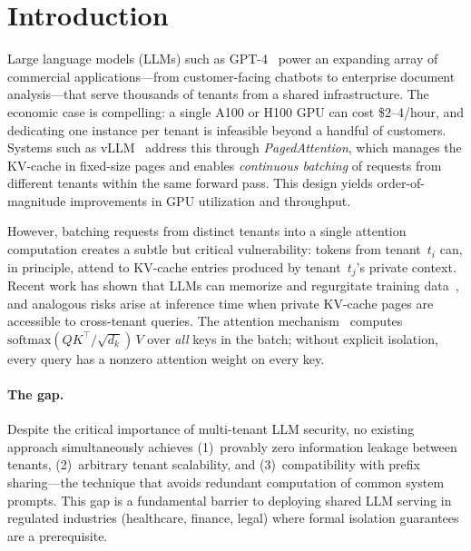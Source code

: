 \documentclass[11pt]{article}
\begin{document}
\section{Introduction}
\label{sec:introduction}

Large language models (LLMs) such as GPT-4~\citep{brown2020language,
achiam2023gpt4} power an expanding array of commercial applications---from
customer-facing chatbots to enterprise document analysis---that serve
thousands of tenants from a shared infrastructure.  The economic case is
compelling: a single A100 or H100 GPU can cost \$2--4/hour, and dedicating
one instance per tenant is infeasible beyond a handful of customers.
Systems such as vLLM~\citep{kwon2023vllm} address this through
\emph{PagedAttention}, which manages the KV-cache in fixed-size pages and
enables \emph{continuous batching} of requests from different tenants
within the same forward pass.  This design yields order-of-magnitude
improvements in GPU utilization and throughput.

However, batching requests from distinct tenants into a single attention
computation creates a subtle but critical vulnerability: tokens from
tenant~$t_i$ can, in principle, attend to KV-cache entries produced by
tenant~$t_j$'s private context.  Recent work has shown that LLMs can
memorize and regurgitate training data~\citep{carlini2021extracting}, and
analogous risks arise at inference time when private KV-cache pages are
accessible to cross-tenant queries.  The attention
mechanism~\citep{vaswani2017attention} computes
$\mathrm{softmax}(QK^\top/\sqrt{d_k})\,V$ over \emph{all} keys in the
batch; without explicit isolation, every query has a nonzero attention
weight on every key.

\paragraph{The gap.}
Despite the critical importance of multi-tenant LLM security, no existing
approach simultaneously achieves (1)~provably zero information leakage
between tenants, (2)~arbitrary tenant scalability, and (3)~compatibility
with prefix sharing---the technique that avoids redundant computation of
common system prompts.  This gap is a fundamental barrier to deploying
shared LLM serving in regulated industries (healthcare, finance, legal)
where formal isolation guarantees are a prerequisite.
\end{document}
